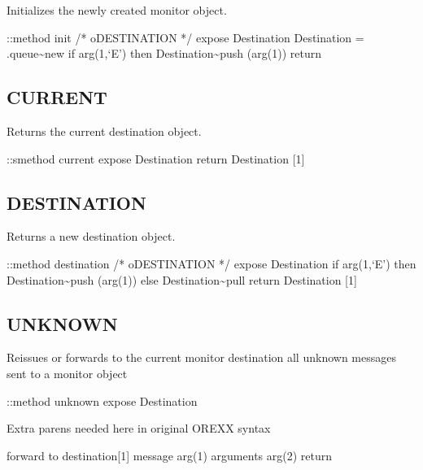 Initializes the newly created monitor object.

::method init /* oDESTINATION */ expose Destination Destination =
.queue\textasciitilde new if arg(1,`E') then
Destination\textasciitilde push (arg(1)) return

\hypertarget{current}{%
\subsection{CURRENT}\label{current}}

Returns the current destination object.

::smethod current expose Destination return Destination {[}1{]}

\hypertarget{destination}{%
\subsection{DESTINATION}\label{destination}}

Returns a new destination object.

::method destination /* oDESTINATION */ expose Destination if arg(1,`E')
then Destination\textasciitilde push (arg(1)) else
Destination\textasciitilde pull return Destination {[}1{]}

\hypertarget{unknown-1}{%
\subsection{UNKNOWN}\label{unknown-1}}

Reissues or forwards to the current monitor destination all unknown
messages sent to a monitor object

::method unknown expose Destination

Extra parens needed here in original OREXX syntax

forward to destination{[}1{]} message arg(1) arguments arg(2) return
